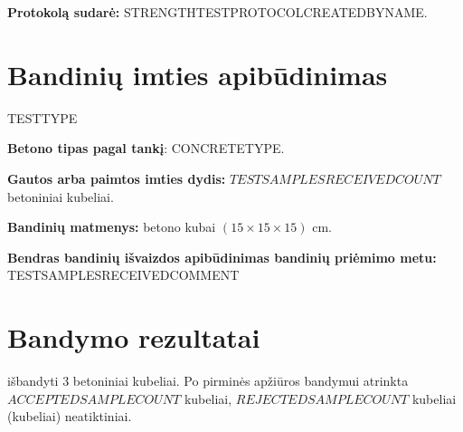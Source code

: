 \documentclass[a4paper, 12pt]{article}
\begin{document}
\hspace{5.25cm} {\bf Protokolą sudarė:} {{{STRENGTHTESTPROTOCOLCREATEDBYNAME}}}.%

\section{Bandinių imties apibūdinimas}

\hspace{\parindent}{\bf Bandymo tipas pagal LST EN 206-1 8.2.1.2 ir/arba 8.2.1.3 pastraipas:} {{{TESTTYPE}} }

{\bf Betono tipas pagal tankį}: {{{CONCRETETYPE}}}.%

{\bf Gautos arba paimtos imties dydis:} $ {{TESTSAMPLESRECEIVEDCOUNT}} $ betoniniai kubeliai. 
	
	{\bf Bandinių matmenys:} betono kubai { $ (15 \times 15 \times 15) $} cm.
	
	{\bf Bendras bandinių išvaizdos apibūdinimas bandinių priėmimo metu:} {{TESTSAMPLESRECEIVEDCOMMENT}} %


\section{Bandymo rezultatai}

\hspace{\parindent}{\bf Imties dydis:} išbandyti $ 3 $ betoniniai kubeliai.
Po pirminės apžiūros bandymui atrinkta $ {{ACCEPTEDSAMPLECOUNT}} $ kubeliai,
$ {{REJECTEDSAMPLECOUNT}} $ kubeliai (kubeliai) neatiktiniai. %
\end{document}
